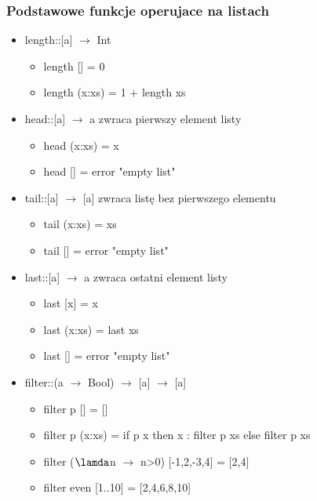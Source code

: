 \documentclass[11pt,a4paper]{article}
\begin{document}
\subsubsection{Podstawowe funkcje operujace na listach}
\begin{itemize}
    \item length::[a] $\rightarrow$ Int
        \begin{itemize}
            \item length [] = 0
            \item length (x:xs) = 1 + length xs
        \end{itemize}
    \item head::[a] $\rightarrow$ a \newline
        zwraca pierwszy element listy
        \begin{itemize}
            \item head (x:xs) = x
            \item head [] = error "empty list"
        \end{itemize}
    \item tail::[a] $\rightarrow$ [a] \newline
        zwraca listę bez pierwszego elementu
        \begin{itemize}
            \item tail (x:xs) = xs
            \item tail [] = error "empty list"
        \end{itemize}
    \item last::[a] $\rightarrow$ a \newline
        zwraca ostatni element listy
        \begin{itemize}
            \item last [x] = x
            \item last (x:xs) = last xs
            \item last [] = error "empty list"
        \end{itemize}
    \item filter::(a $\rightarrow$ Bool) $\rightarrow$ [a] $\rightarrow$ [a]
        \begin{itemize}
            \item filter p [] = []
            \item filter p (x:xs) = if p x then x : filter p xs else filter p xs
            \item filter ($\lamda$n $\rightarrow$ n>0) [-1,2,-3,4] = [2,4]
            \item filter even [1..10] = [2,4,6,8,10]\newline

\end{itemize}
\end{itemize}
\end{document}
